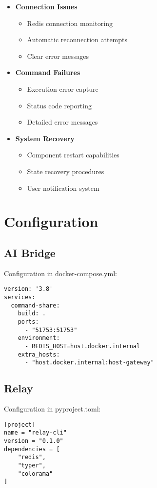 \documentclass{article}
\begin{document}
\begin{itemize}
    \item \textbf{Connection Issues}
    \begin{itemize}
        \item Redis connection monitoring
        \item Automatic reconnection attempts
        \item Clear error messages
    \end{itemize}
    
    \item \textbf{Command Failures}
    \begin{itemize}
        \item Execution error capture
        \item Status code reporting
        \item Detailed error messages
    \end{itemize}
    
    \item \textbf{System Recovery}
    \begin{itemize}
        \item Component restart capabilities
        \item State recovery procedures
        \item User notification system
    \end{itemize}
\end{itemize}

\section{Configuration}

\subsection{AI Bridge}
Configuration in docker-compose.yml:
\begin{verbatim}
version: '3.8'
services:
  command-share:
    build: .
    ports:
      - "51753:51753"
    environment:
      - REDIS_HOST=host.docker.internal
    extra_hosts:
      - "host.docker.internal:host-gateway"
\end{verbatim}

\subsection{Relay}
Configuration in pyproject.toml:
\begin{verbatim}
[project]
name = "relay-cli"
version = "0.1.0"
dependencies = [
    "redis",
    "typer",
    "colorama"
]
\end{verbatim}
\end{document}
